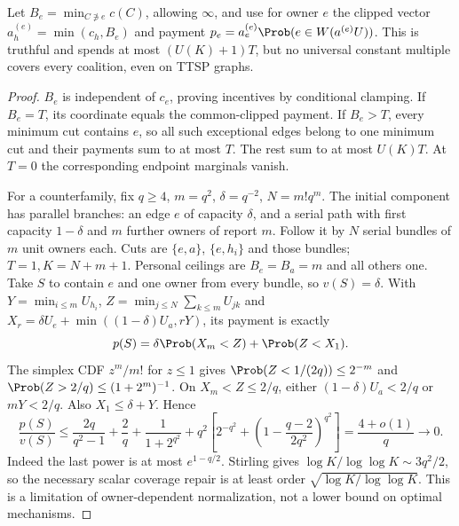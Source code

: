 \begin{proposition}\label{noise:ceilings}
Let $B_e=\min_{C\not\ni e}c(C)$, allowing $\infty$, and use for owner
$e$ the clipped vector $a_h^{(e)}=\min(c_h,B_e)$ and payment
$p_e=a_e^{(e)}\Prob(e\in W(a^{(e)}U))$.
This is truthful and spends at most $(U(K)+1)T$, but no universal constant
multiple covers every coalition, even on TTSP graphs.
\end{proposition}
\begin{proof}
$B_e$ is independent of $c_e$, proving incentives by conditional clamping.
If $B_e=T$, its coordinate equals the common-clipped payment. If $B_e>T$,
every minimum cut contains $e$, so all such exceptional edges belong to one
minimum cut and their payments sum to at most $T$. The rest sum to at most
$U(K)T$. At $T=0$ the corresponding endpoint marginals vanish.

For a counterfamily, fix $q\ge4$, $m=q^2$, $\delta=q^{-2}$,
$N=m!q^m$. The initial component has parallel branches: an edge $e$ of
capacity $\delta$, and a serial path with first capacity $1-\delta$ and
$m$ further owners of report $m$. Follow it by $N$ serial bundles of $m$
unit owners each. Cuts are $\{e,a\}$, $\{e,h_i\}$ and those bundles;
$T=1,K=N+m+1$. Personal ceilings are $B_e=B_a=m$ and all others one.
Take $S$ to contain $e$ and one owner from every bundle, so $v(S)=\delta$.
With $Y=\min_{i\le m}U_{h_i}$,
$Z=\min_{j\le N}\sum_{k\le m}U_{jk}$ and
$X_r=\delta U_e+\min((1-\delta)U_a,rY)$, its payment is exactly
\[
 p(S)=\delta\Prob(X_m<Z)+\Prob(Z<X_1).
\]
The simplex CDF $z^m/m!$ for $z\le1$ gives
$\Prob(Z<1/(2q))\le2^{-m}$ and
$\Prob(Z>2/q)\le(1+2^m)^{-1}$.
On $X_m<Z\le2/q$, either $(1-\delta)U_a<2/q$ or $mY<2/q$.
Also $X_1\le\delta+Y$. Hence
\[
 \frac{p(S)}{v(S)}\le
 \frac{2q}{q^2-1}+\frac2q+\frac1{1+2^{q^2}}
 +q^2\left[2^{-q^2}+
  \left(1-\frac{q-2}{2q^2}\right)^{q^2}\right]
 =\frac{4+o(1)}q\longrightarrow0.
\]
Indeed the last power is at most $e^{1-q/2}$.
Stirling gives $\log K/\log\log K\sim3q^2/2$, so the necessary scalar
coverage repair is at least order $\sqrt{\log K/\log\log K}$.
This is a limitation of owner-dependent normalization, not a lower bound
on optimal mechanisms.
\end{proof}

